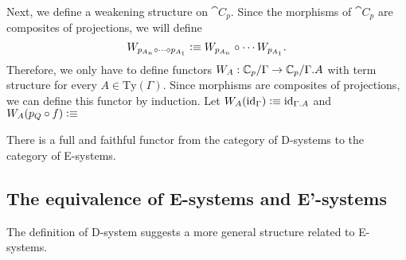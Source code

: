 \begin{constr}
Next, we define a weakening structure on $\cat{C}_p$. Since the morphisms of
$\cat{C}_p$ are composites of projections, we will define
\begin{equation*}
W_{p_{A_n}\circ\cdots\circ p_{A_1}}\vcentcolon\equiv W_{p_{A_n}}\circ\cdots W_{p_{A_1}}.
\end{equation*}
Therefore, we only have to define functors 
$W_A:\cat{C}_p/\Gamma\to\cat{C}_p/\ctxext{\Gamma}{A}$ with term structure for every 
$A\in\mathrm{Ty}(\Gamma)$. Since morphisms are composites of projections, we
can define this functor by induction. Let $W_A(\catid{\Gamma})\defeq
\catid{\ctxext{\Gamma}{A}}$ and $W_A(p_Q\circ f)\vcentcolon\equiv$
\end{constr}

\begin{thm}
There is a full and faithful functor from the category of D-systems to the
category of E-systems.
\end{thm}

\subsection{The equivalence of E-systems and E'-systems}

The definition of D-system suggests a more general structure related to E-systems. 

